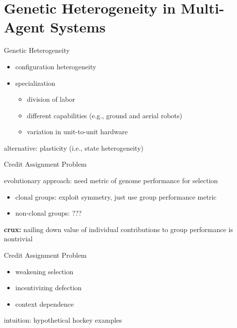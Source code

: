 \section{Genetic Heterogeneity in Multi-Agent Systems}

\begin{frame}{Genetic Heterogeneity}

\Large

\begin{itemize}
\item configuration heterogeneity
\item specialization
\begin{itemize}
\item division of labor \cite{potter2001heterogeneity}
\item different capabilities (e.g., ground and aerial robots) \cite{gomes2015cooperative, mathews2012supervised}
\item variation in unit-to-unit hardware \cite{pugh2007parallel, duarte2016evolution}
\end{itemize}
\end{itemize}

alternative: plasticity (i.e., state heterogeneity) \cite{tuci2008evolving}

\end{frame}

\begin{frame}{Credit Assignment Problem}

\Large

evolutionary approach: need metric of genome performance for selection
\begin{itemize}
\item clonal groups: exploit symmetry, just use group performance metric
\item non-clonal groups: ???
\end{itemize}

\textbf{crux:} nailing down value of individual contributions to group performance is nontrivial \cite{panait2005cooperative}

\end{frame}

\begin{frame}{Credit Assignment Problem}

\Large

\begin{itemize}
\item weakening selection \cite{knudson2010coevolution, waibel2009genetic}
\item incentivizing defection \cite{knudson2010coevolution, waibel2009genetic}
\item context dependence \cite{gomes2015cooperative}
\end{itemize}

\pause

intuition: hypothetical hockey examples

\end{frame}

